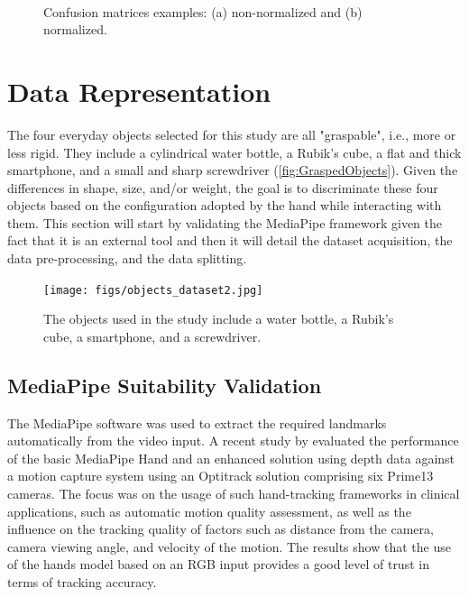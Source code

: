 \begin{figure}[ht]
    \centering
    \begin{subfigure}[b]{0.48\textwidth}
        {\fontsize{10}{12}\selectfont}
        \caption{}
        \label{fig:non-norm_conf_matrix}
    \end{subfigure} \
    \begin{subfigure}[b]{0.48\textwidth}
        {\fontsize{10}{12}\selectfont}
        \caption{}
        \label{fig:norm_conf_matrix}
    \end{subfigure}
    \caption[Confusion matrices examples: non-normalized and normalized.]{Confusion matrices examples: (a) non-normalized and (b) normalized.}
    \label{fig:conf_matrix_examples}
\end{figure}

\section{Data Representation}
\label{section:data_representation}

The four everyday objects selected for this study are all "graspable", i.e., more or less rigid. They include a cylindrical water bottle, a Rubik’s cube, a flat and thick smartphone, and a small and sharp screwdriver (\autoref{fig:GraspedObjects}). Given the differences in shape, size, and/or weight, the goal is to discriminate these four objects based on the configuration adopted by the hand while interacting with them. This section will start by validating the MediaPipe framework given the fact that it is an external tool and then it will detail the dataset acquisition, the data pre-processing, and the data splitting. 

\begin{figure}[ht]
\captionsetup{width=0.7\textwidth}
\centering
\texttt{[image: figs/objects\_dataset2.jpg]}
\caption{The objects used in the study include a water bottle, a Rubik’s cube, a smartphone, and a screwdriver.}
\label{fig:GraspedObjects}
\end{figure}

\subsection{MediaPipe Suitability Validation}

The MediaPipe software was used to extract the required landmarks automatically from the video input. A recent study by \textcite{Amprimo2023} evaluated the performance of the basic MediaPipe Hand \cite{Zhang2020} and an enhanced solution using depth data \cite{Amprimo2022} against a motion capture system using an Optitrack solution comprising six Prime13 cameras. The focus was on the usage of such hand-tracking frameworks in clinical applications, such as automatic motion quality assessment, as well as the influence on the tracking quality of factors such as distance from the camera, camera viewing angle, and velocity of the motion. The results show that the use of the hands model based on an RGB input provides a good level of trust in terms of tracking accuracy.

